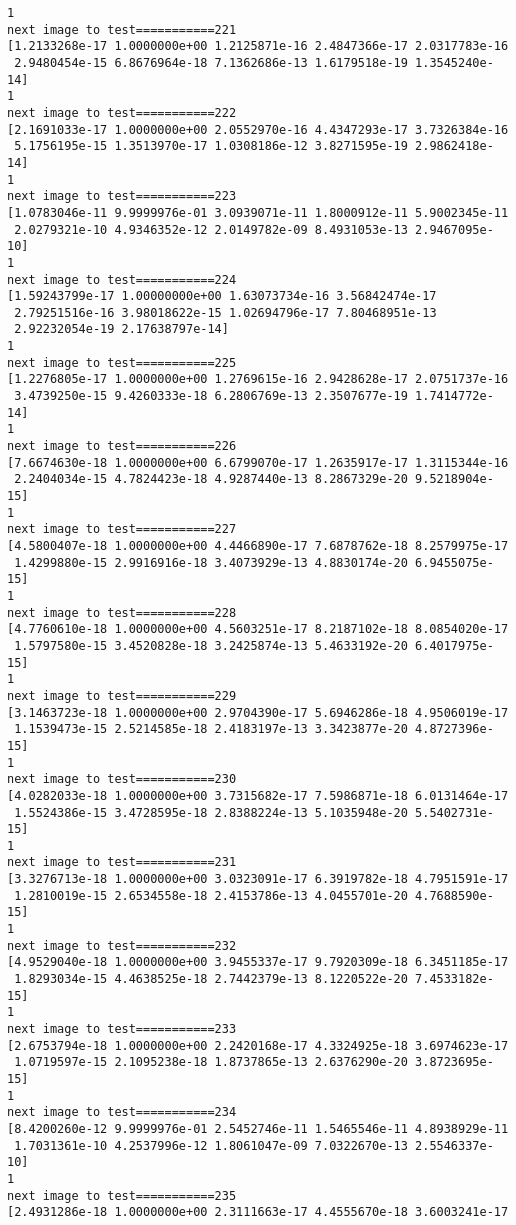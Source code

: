 \documentclass[11pt]{article}
\begin{document}
\begin{Verbatim}[commandchars=\\\{\}]
1
next image to test===========221
[1.2133268e-17 1.0000000e+00 1.2125871e-16 2.4847366e-17 2.0317783e-16
 2.9480454e-15 6.8676964e-18 7.1362686e-13 1.6179518e-19 1.3545240e-14]
1
next image to test===========222
[2.1691033e-17 1.0000000e+00 2.0552970e-16 4.4347293e-17 3.7326384e-16
 5.1756195e-15 1.3513970e-17 1.0308186e-12 3.8271595e-19 2.9862418e-14]
1
next image to test===========223
[1.0783046e-11 9.9999976e-01 3.0939071e-11 1.8000912e-11 5.9002345e-11
 2.0279321e-10 4.9346352e-12 2.0149782e-09 8.4931053e-13 2.9467095e-10]
1
next image to test===========224
[1.59243799e-17 1.00000000e+00 1.63073734e-16 3.56842474e-17
 2.79251516e-16 3.98018622e-15 1.02694796e-17 7.80468951e-13
 2.92232054e-19 2.17638797e-14]
1
next image to test===========225
[1.2276805e-17 1.0000000e+00 1.2769615e-16 2.9428628e-17 2.0751737e-16
 3.4739250e-15 9.4260333e-18 6.2806769e-13 2.3507677e-19 1.7414772e-14]
1
next image to test===========226
[7.6674630e-18 1.0000000e+00 6.6799070e-17 1.2635917e-17 1.3115344e-16
 2.2404034e-15 4.7824423e-18 4.9287440e-13 8.2867329e-20 9.5218904e-15]
1
next image to test===========227
[4.5800407e-18 1.0000000e+00 4.4466890e-17 7.6878762e-18 8.2579975e-17
 1.4299880e-15 2.9916916e-18 3.4073929e-13 4.8830174e-20 6.9455075e-15]
1
next image to test===========228
[4.7760610e-18 1.0000000e+00 4.5603251e-17 8.2187102e-18 8.0854020e-17
 1.5797580e-15 3.4520828e-18 3.2425874e-13 5.4633192e-20 6.4017975e-15]
1
next image to test===========229
[3.1463723e-18 1.0000000e+00 2.9704390e-17 5.6946286e-18 4.9506019e-17
 1.1539473e-15 2.5214585e-18 2.4183197e-13 3.3423877e-20 4.8727396e-15]
1
next image to test===========230
[4.0282033e-18 1.0000000e+00 3.7315682e-17 7.5986871e-18 6.0131464e-17
 1.5524386e-15 3.4728595e-18 2.8388224e-13 5.1035948e-20 5.5402731e-15]
1
next image to test===========231
[3.3276713e-18 1.0000000e+00 3.0323091e-17 6.3919782e-18 4.7951591e-17
 1.2810019e-15 2.6534558e-18 2.4153786e-13 4.0455701e-20 4.7688590e-15]
1
next image to test===========232
[4.9529040e-18 1.0000000e+00 3.9455337e-17 9.7920309e-18 6.3451185e-17
 1.8293034e-15 4.4638525e-18 2.7442379e-13 8.1220522e-20 7.4533182e-15]
1
next image to test===========233
[2.6753794e-18 1.0000000e+00 2.2420168e-17 4.3324925e-18 3.6974623e-17
 1.0719597e-15 2.1095238e-18 1.8737865e-13 2.6376290e-20 3.8723695e-15]
1
next image to test===========234
[8.4200260e-12 9.9999976e-01 2.5452746e-11 1.5465546e-11 4.8938929e-11
 1.7031361e-10 4.2537996e-12 1.8061047e-09 7.0322670e-13 2.5546337e-10]
1
next image to test===========235
[2.4931286e-18 1.0000000e+00 2.3111663e-17 4.4555670e-18 3.6003241e-17

\end{Verbatim}
\end{document}
